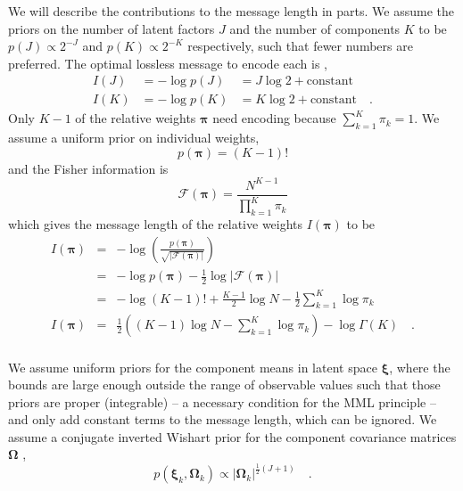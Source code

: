 \documentclass[twocolumn]{aastex62}
\newcommand{\vect}[1]{\boldsymbol{\mathbf{#1}}}
\renewcommand{\vec}[1]{\vect{#1}}
\newcommand{\weight}{\pi}
\newcommand{\scoremeans}{\vec\xi}
\newcommand{\scorecovs}{\vec\Omega}
\newcommand{\NumData}{N}
\newcommand{\NumLatentFactors}{J}
\newcommand{\NumComponents}{K}
\newcommand{\numcomponents}{k}
\begin{document}
We will describe the contributions to the message length in parts. We assume
the priors on the number of latent factors $\NumLatentFactors$ and the
number of components $\NumComponents$ to be
$p(\NumLatentFactors) \propto 2^{-\NumLatentFactors}$ and
$p(\NumComponents) \propto 2^{-\NumComponents}$ respectively,
such that fewer numbers are preferred. The optimal lossless message to 
encode each is \citep[Sec. 6.8.2;][]{Knorr-Held:2000},
\begin{eqnarray}
	I(\NumLatentFactors) &= -\log{p(\NumLatentFactors)} &= \NumLatentFactors\log{2} + \textrm{constant} \label{eq:prior_J} \\
	I(\NumComponents) &= -\log{p(\NumComponents)} &= \NumComponents\log{2} + \textrm{constant} \label{eq:prior_K} \quad .
\end{eqnarray}
Only $\NumComponents - 1$ of the relative weights $\vec\weight$ need encoding because 
$\sum_{\numcomponents=1}^{\NumComponents}\weight_\numcomponents = 1$. We assume a uniform prior on 
individual weights,
\begin{equation}
	p(\vec\weight) = (\NumComponents - 1)!
\end{equation}
\noindent{}and the Fisher information is
\begin{equation}
	\mathcal{F}(\vec\weight) = \frac{\NumData^{\NumComponents - 1}}{\prod_{\numcomponents=1}^{\NumComponents}\weight_\numcomponents}
\end{equation}
\noindent{}which gives the message length of the relative weights $I(\vec\weight)$ to be
\begin{eqnarray}
	I(\vec\weight) &=& -\log\left(\frac{p(\vec\weight)}{\sqrt{|\mathcal{F}(\vec\weight)|}}\right) \nonumber \\
			   &=& -\log{p(\vec\weight)} - \frac{1}{2}\log{|\mathcal{F}(\vec\weight)|} \nonumber  \\
			   &=& -\log(\NumComponents - 1)! + \frac{\NumComponents - 1}{2}\log{\NumData} - \frac{1}{2}\sum_{\numcomponents=1}^{\NumComponents}\log\weight_\numcomponents \nonumber \\
	I(\vec\weight) &=& \frac{1}{2}\left(\left(\NumComponents - 1\right)\log\NumData - \sum_{\numcomponents=1}^{\NumComponents}\log\weight_\numcomponents\right) -\log\Gamma(\NumComponents) \quad . \nonumber \label{eq:prior_pi} \\
\end{eqnarray}

We assume uniform priors for the component means in latent space $\scoremeans$, 
where the bounds are large enough outside the range of observable values such
that those priors are proper (integrable) -- a necessary condition for the MML principle -- 
and only add constant terms to the message length, which can be ignored. We assume 
a conjugate inverted Wishart prior for the component covariance matrices
$\scorecovs$ \citep{WallaceDowe1994b,WallaceDowe2000,Knorr-Held:2000},
\begin{equation}
	p(\scoremeans_\numcomponents,\scorecovs_\numcomponents) \propto |\scorecovs_\numcomponents|^{\frac{1}{2}(\NumLatentFactors + 1)} \quad .
\end{equation}
\end{document}
